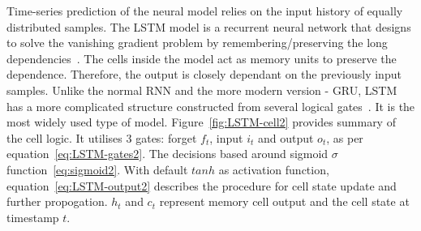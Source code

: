 Time-series prediction of the neural model relies on the input history of equally distributed samples.
The LSTM model is a recurrent neural network that designs to solve the vanishing gradient problem by remembering/preserving the long dependencies~\cite{rasifaghihi_predictive_2020}.
The cells inside the model act as memory units to preserve the dependence.
Therefore, the output is closely dependant on the previously input samples.
Unlike the normal RNN and the more modern version - GRU, LSTM has a more complicated structure constructed from several logical gates~\cite{LSTM_Hochreiter1997}.
It is the most widely used type of model.
Figure~\ref{fig:LSTM-cell2} provides summary of the cell logic.
It utilises 3 gates: forget $f_t$, input $i_t$ and output $o_t$, as per equation~\ref{eq:LSTM-gates2}.
The decisions based around sigmoid $\sigma$ function~\ref{eq:sigmoid2}.
With default $tanh$ as activation function, equation~\ref{eq:LSTM-output2} describes the procedure for cell state update and further propogation.
$h_t$ and $c_t$ represent memory cell output and the cell state at timestamp $t$.

